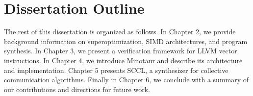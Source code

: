 \section{Dissertation Outline}

The rest of this dissertation is organized as follows. In Chapter 2, we
provide background information on superoptimization, SIMD architectures,
and program synthesis. In Chapter 3, we present a verification framework
for LLVM vector instructions. In Chapter 4, we introduce Minotaur and
describe its architecture and implementation. Chapter 5 presents SCCL,
a synthesizer for collective communication algorithms. Finally in Chapter
6, we conclude with a summary of our contributions and directions for
future work.





